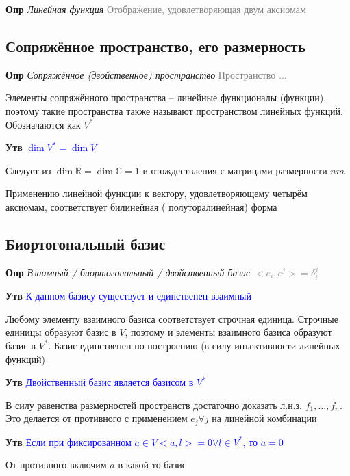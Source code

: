 \documentclass[a4paper, 14pt]{article}
\begin{document}
    \textbf{Опр} \textit{Линейная функция} \textcolor{gray}{Отображение, удовлетворяющая двум аксиомам}
    
    \subsection{Сопряжённое пространство, его размерность}
    
    \textbf{Опр} \textit{Сопряжённое (двойственное) пространство} \textcolor{gray}{Пространство ...}
    
    Элементы сопряжённого пространства -- линейные функционалы (функции), поэтому такие пространства также называют
    пространством линейных функций.
    Обозначаются как $V^*$
    
    \textbf{Утв} \textcolor{blue}{$\dim V^* = \dim V$}
    
    Следует из $\dim \mathbb{R} = \dim \mathbb{C} = 1$ и отождествления с матрицами размерности $nm$
    
    Применению линейной функции к вектору, удовлетворяющему четырём аксиомам, соответствует билинейная (
    полуторалинейная) форма
    
    \subsection{Биортогональный базис}
    
    \textbf{Опр} \textit{Взаимный / биортогональный / двойственный базис} \textcolor{gray}{$<e_i, e^j> = \delta_i^j$}
    
    \textbf{Утв} \textcolor{blue}{К данном базису существует и единственен взаимный}
    
    Любому элементу взаимного базиса соответствует строчная единица.
    Строчные единицы образуют базис в $V$, поэтому и элементы взаимного базиса образуют базис в $V^*$.
    Базис единственен по построению (в силу инъективности линейных функций)
    
    \textbf{Утв} \textcolor{blue}{Двойственный базис является базисом в $V^*$}
    
    В силу равенства размерностей пространств достаточно доказать л.н.з. $f_1, \dots, f_n$.
    Это делается от противного с применением $e_j \forall j$ на линейной комбинации
    
    \textbf{Утв} \textcolor{blue}{Если при фиксированном $a \in V <a, l> = 0 \forall l \in V^*$, то $a = 0$}
    
    От противного включим $a$ в какой-то базис
    
\end{document}
